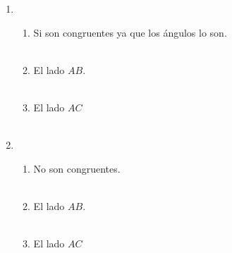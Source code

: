 \documentclass[10pt]{article}
\begin{document}
\begin{enumerate}
\item 
\begin{enumerate}[\bfseries a)]
    
    \item Si son congruentes ya que los ángulos lo son.\\\\ 

    \item El lado $AB$.\\\\

    \item El lado $AC$\\\\

\end{enumerate}

\item 
\begin{enumerate}[\bfseries a)]
    
    \item No son congruentes.\\\\

    \item El lado $AB$.\\\\

    \item El lado $AC$\\\\

\end{enumerate}




\end{enumerate}
\end{document}
